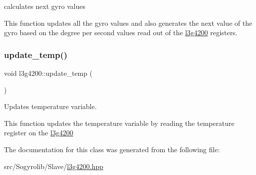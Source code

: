 calculates next gyro values 

This function updates all the gyro values and also generates the next value of the gyro based on the degree per second values read out of the \hyperlink{classl3g4200}{l3g4200} registers. \mbox{\label{classl3g4200_a42255bd4a0fc8b465b0b48d9f853ed74}} 
\subsubsection{\texorpdfstring{update\+\_\+temp()}{update\_temp()}}
{\footnotesize\ttfamily void l3g4200\+::update\+\_\+temp (\begin{DoxyParamCaption}{ }\end{DoxyParamCaption})\hspace{0.3cm}{\ttfamily [inline]}}



Updates temperature variable. 

This function updates the temperature variable by reading the temperature register on the \hyperlink{classl3g4200}{l3g4200} 

The documentation for this class was generated from the following file\+:\begin{DoxyCompactItemize}
\item 
src/\+Sogyrolib/\+Slave/\hyperlink{l3g4200_8hpp}{l3g4200.\+hpp}\end{DoxyCompactItemize}
